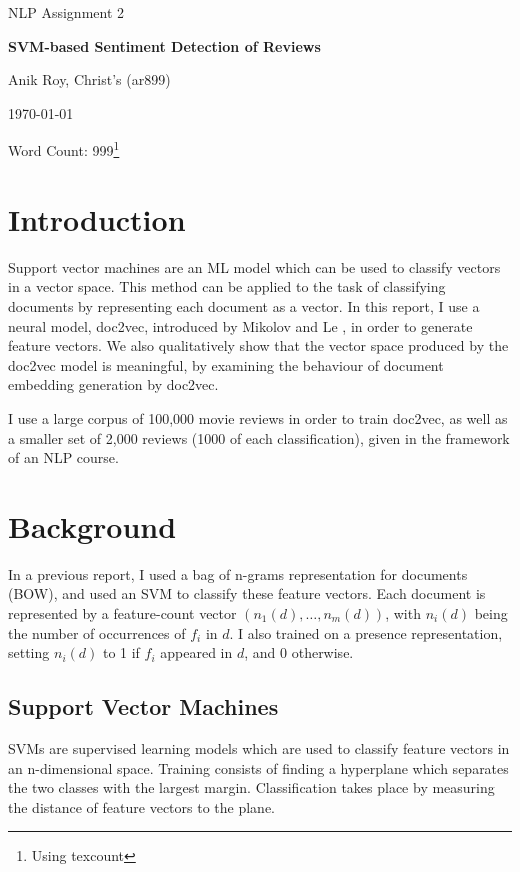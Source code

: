 \documentclass[a4paper]{article}
\begin{document}
\centerline{\large NLP Assignment 2}
\vspace{0.2in}
\centerline{\Large\bf SVM-based Sentiment Detection of Reviews}
\vspace{0.1in}
\centerline{\large {Anik Roy, Christ's (ar899)}}
\vspace{0.1in}
\centerline{\large {\today}}
\vspace{0.05in}
\centerline{Word Count: 999\footnote{Using texcount}}
\vspace{0.2in}


\begin{multicols}{2}
  
\section{Introduction}

Support vector machines are an ML model which can be used to classify vectors in a vector space. This method can be applied to the task of classifying documents by representing each document as a vector. In this report, I use a neural model, doc2vec, introduced by Mikolov and Le \cite{DBLP:journals/corr/LeM14}, in order to generate feature vectors. We also qualitatively show that the vector space produced by the doc2vec model is meaningful, by examining the behaviour of document embedding generation by doc2vec.

I use a large corpus of 100,000 movie reviews in order to train doc2vec, as well as a smaller set of 2,000 reviews (1000 of each classification), given in the framework of an NLP course.

\section{Background}

In a previous report, I used a bag of n-grams representation for documents (BOW), and used an SVM to classify these feature vectors. Each document is represented by a feature-count vector $(n_1(d), \dots ,n_m(d))$, with $n_i(d)$ being the number of occurrences of $f_i$ in $d$. I also trained on a presence representation, setting $n_i(d)$ to 1 if $f_i$ appeared in $d$, and 0 otherwise.

\subsection{Support Vector Machines}

SVMs are supervised learning models which are used to classify feature vectors in an n-dimensional space. Training consists of finding a hyperplane which separates the two classes with the largest margin. Classification takes place by measuring the distance of feature vectors to the plane. 


\end{multicols}
\end{document}
